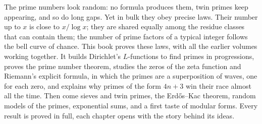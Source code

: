 The prime numbers look random: no formula produces them, twin primes keep appearing, and so do long gaps. Yet in bulk
they obey precise laws. Their number up to $x$ is close to $x/\log x$; they are shared equally among the residue classes
that can contain them; the number of prime factors of a typical integer follows the bell curve of chance. This book proves
these laws, with all the earlier volumes working together. It builds Dirichlet's $L$-functions to find primes in progressions, proves the prime number theorem, studies
the zeros of the zeta function and Riemann's explicit formula, in which the primes are a superposition of waves, one
for each zero, and explains why primes of the form $4n+3$ win their race almost all the time. Then come sieves and
twin primes, the Erd\H{o}s--Kac theorem, random models of the primes, exponential sums, and a first taste of modular
forms. Every result is proved in full, each chapter opens with the story behind its ideas.
